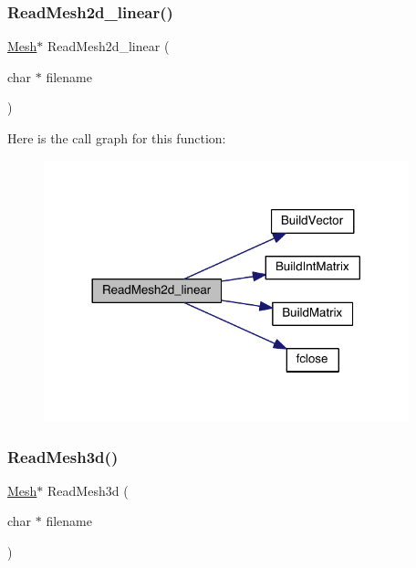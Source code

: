 \subsubsection{\texorpdfstring{Read\+Mesh2d\+\_\+linear()}{ReadMesh2d\_linear()}}
{\footnotesize\ttfamily \hyperlink{a00557_aeffbe0891ab73a4d8964c9cb7978426e}{Mesh}$\ast$ Read\+Mesh2d\+\_\+linear (\begin{DoxyParamCaption}\item[{char $\ast$}]{filename }\end{DoxyParamCaption})}

Here is the call graph for this function\+:\nopagebreak
\begin{figure}[H]
\begin{center}
\leavevmode
\includegraphics[width=300pt]{a00554_a992690ab68b8564681b5a038ca111413_cgraph}
\end{center}
\end{figure}
\mbox{\label{a00554_ae31747f9df306a59e6f4df61fddfe15f}} 
\subsubsection{\texorpdfstring{Read\+Mesh3d()}{ReadMesh3d()}}
{\footnotesize\ttfamily \hyperlink{a00557_aeffbe0891ab73a4d8964c9cb7978426e}{Mesh}$\ast$ Read\+Mesh3d (\begin{DoxyParamCaption}\item[{char $\ast$}]{filename }\end{DoxyParamCaption})}

